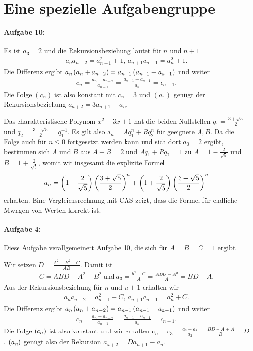 \documentclass[11pt,a4paper]{article}
\begin{document}
\section*{Eine spezielle Aufgabengruppe}

\paragraph{Aufgabe 10:}
Es ist $a_3=2$ und die Rekursionsbeziehung lautet für $n$ und $n+1$ 
\begin{gather*}
  a_na_{n-2}=a_{n-1}^2+1,\ a_{n+1}a_{n-1}=a_n^2+1.
\end{gather*}
Die Differenz ergibt $a_n\left(a_n+a_{n-2}\right)=a_{n-1}\left(a_{n+1}+a_{n-1}\right)$ und
weiter 
\begin{gather*}
  c_n=\frac{a_n+a_{n-2}}{a_{n-1}}=\frac{a_{n+1}+a_{n-1}}{a_n}=c_{n+1}.
\end{gather*}
Die Folge $(c_n)$ ist also konstant mit $c_n=3$ und $(a_n)$ genügt der
Rekursionsbeziehung $a_{n+2}=3a_{n+1}-a_n$.

Das charakteristische Polynom $x^2-3x+1$ hat die beiden Nullstellen
$q_1=\frac{3+\sqrt{5}}{2}$ und $q_2=\frac{3-\sqrt{5}}{2}=q_1^{-1}$.  Es gilt
also $a_n=Aq_1^n+Bq_2^n$ für geeignete $A,B$.  Da die Folge auch für $n\le 0$
fortgesetzt werden kann und sich dort $a_0=2$ ergibt, bestimmen sich $A$ und
$B$ aus $A+B=2$ und $Aq_1+Bq_2=1$ zu $A=1-\frac{2}{\sqrt{5}}$ und
$B=1+\frac{2}{\sqrt{5}}$, womit wir insgesamt die explizite Formel
\begin{gather*}
  a_n=\left(1-\frac{2}{\sqrt{5}}\right)\left(\frac{3+\sqrt{5}}{2}\right)^n
  +\left(1+\frac{2}{\sqrt{5}}\right)\left(\frac{3-\sqrt{5}}{2}\right)^n 
\end{gather*}
erhalten.  Eine Vergleichsrechnung mit CAS zeigt, dass die Formel für endliche
Mwngen von Werten korrekt ist.

\paragraph{Aufgabe 4:}
Diese Aufgabe verallgemeinert Aufgabe 10, die sich für $A=B=C=1$ ergibt. 

Wir setzen $D=\frac{A^2+B^2+C}{AB}$. Damit ist 
\begin{gather*}
  C=ABD-A^2-B^2\ \text{und}\ a_3=\frac{b^2+C}{A}=\frac{ABD-A^2}{A}=BD-A.
\end{gather*}
Aus der Rekursionsbeziehung für $n$ und $n+1$ erhalten wir
\begin{gather*}
  a_na_{n-2}=a_{n-1}^2+C,\ a_{n+1}a_{n-1}=a_n^2+C.
\end{gather*}
Die Differenz ergibt $a_n\left(a_n+a_{n-2}\right)=a_{n-1}\left(a_{n+1}+a_{n-1}\right)$ und
weiter 
\begin{gather*}
  c_n=\frac{a_n+a_{n-2}}{a_{n-1}}=\frac{a_{n+1}+a_{n-1}}{a_n}=c_{n+1}.
\end{gather*}
Die Folge $\left(c_n\right)$ ist also konstant und wir erhalten
$c_n=c_3=\frac{a_3+a_1}{a_2}=\frac{BD-A+A}{B}=D$.  $\left(a_n\right)$ genügt also der
Rekursion $a_{n+2}=Da_{n+1}-a_n$.
\end{document}
